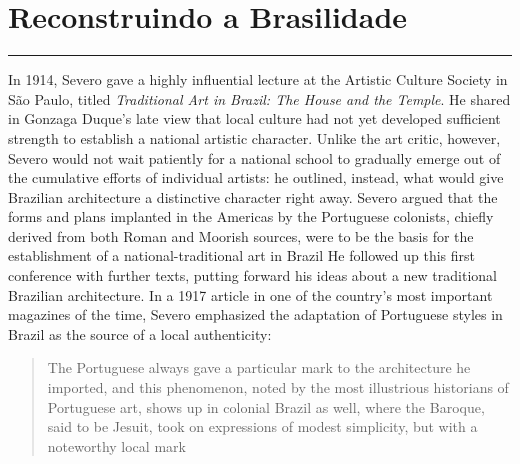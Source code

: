 \hypertarget{reconstruindo-a-brasilidade}{%
\section{Reconstruindo a
Brasilidade}\label{reconstruindo-a-brasilidade}}

\begin{center}\rule{0.5\linewidth}{0.5pt}\end{center}

In 1914, Severo gave a highly influential lecture at the Artistic
Culture Society in São Paulo, titled \emph{Traditional Art in Brazil:
The House and the Temple}. He shared in Gonzaga Duque's late view that
local culture had not yet developed sufficient strength to establish a
national artistic character. Unlike the art critic, however, Severo
would not wait patiently for a national school to gradually emerge out
of the cumulative efforts of individual artists: he outlined, instead,
what would give Brazilian architecture a distinctive character right
away. Severo argued that the forms and plans implanted in the Americas
by the Portuguese colonists, chiefly derived from both Roman and Moorish
sources, were to be the basis for the establishment of a
national-traditional art in Brazil \autocite[p.~249]{azevedo:1994ideas}
He followed up this first conference with further texts, putting forward
his ideas about a new traditional Brazilian architecture. In a 1917
article in one of the country's most important magazines of the time,
Severo emphasized the adaptation of Portuguese styles in Brazil as the
source of a local authenticity:

\begin{quote}
The Portuguese always gave a particular mark to the architecture he
imported, and this phenomenon, noted by the most illustrious historians
of Portuguese art, shows up in colonial Brazil as well, where the
Baroque, said to be Jesuit, took on expressions of modest simplicity,
but with a noteworthy local mark \autocite[p. 402]{severo:1917arte}
\end{quote}

